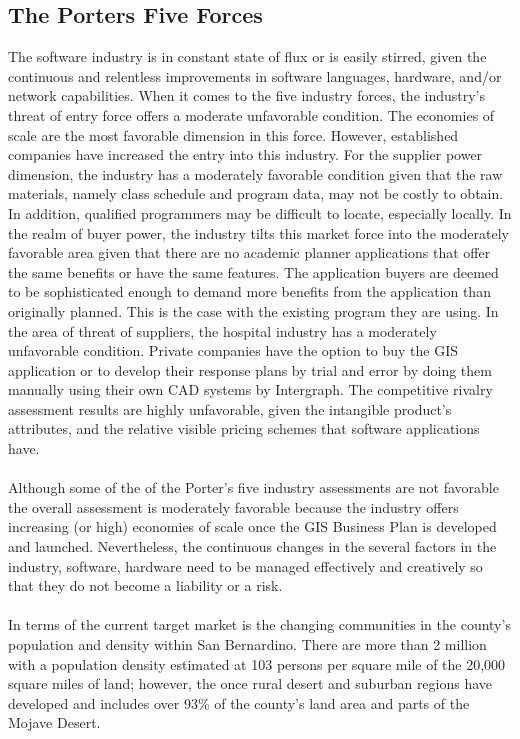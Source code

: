 \documentclass[11pt]{article}\usepackage[]{graphicx}\usepackage[]{color}
\begin{document}
\begin{itemize}
\begin{itemize}
\subsection{The Porters Five Forces}

The software industry is in constant state of flux or is easily stirred, given the continuous and relentless improvements in software languages, hardware, and/or network capabilities.
When it comes to the five industry forces, the industry's threat of entry force offers a moderate unfavorable condition. The economies of scale are the most favorable dimension in this force. However, established companies have increased the entry into this industry. For the supplier power dimension, the industry has a moderately favorable condition given that the raw materials, namely class schedule and program data, may not be costly to obtain. In addition, qualified programmers may be difficult to locate, especially locally. In the realm of buyer power, the industry tilts this market force into the moderately favorable area given that there are no academic planner applications that offer the same benefits or have the same features. The application buyers are deemed to be sophisticated enough to demand more benefits from the application than originally planned. This is the case with the existing program they are using. In the area of threat of suppliers, the hospital industry has a moderately unfavorable condition. Private companies have the option to buy the GIS application or to develop their response plans by trial and error by doing them manually using their own CAD systems by Intergraph. The competitive rivalry assessment results are highly unfavorable, given the intangible product's attributes, and the relative visible pricing schemes that software applications have.
\paragraph{}
Although some of the of the Porter's five industry assessments are not favorable the overall assessment is moderately favorable because the industry offers increasing (or high) economies of scale once the GIS Business Plan is developed and launched. Nevertheless, the continuous changes in the several factors in the industry, software, hardware need to be managed effectively and creatively so that they do not become a liability or a risk.
\paragraph{}
In terms of the current target market is the changing communities in the county's population and density within San Bernardino. There are more than 2 million with a population density estimated at 103 persons per square mile of the 20,000 square miles of land; however, the once rural desert and suburban regions have developed and includes over 93\% of the county's land area and parts of the Mojave Desert.


\end{itemize}
\end{itemize}
\end{document}
